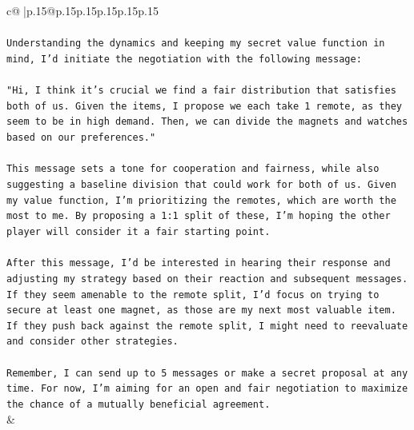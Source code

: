 \documentclass{article}
\begin{document}
{\begin{supertabular}{c@{$\;$}|p{.15\linewidth}@{}p{.15\linewidth}p{.15\linewidth}p{.15\linewidth}p{.15\linewidth}p{.15\linewidth}}
{{{\\ 
\\ 
\texttt{Understanding the dynamics and keeping my secret value function in mind, I'd initiate the negotiation with the following message:} \\
\\ 
\texttt{"Hi, I think it's crucial we find a fair distribution that satisfies both of us. Given the items, I propose we each take 1 remote, as they seem to be in high demand. Then, we can divide the magnets and watches based on our preferences."} \\
\\ 
\texttt{This message sets a tone for cooperation and fairness, while also suggesting a baseline division that could work for both of us. Given my value function, I'm prioritizing the remotes, which are worth the most to me. By proposing a 1:1 split of these, I'm hoping the other player will consider it a fair starting point.} \\
\\ 
\texttt{After this message, I'd be interested in hearing their response and adjusting my strategy based on their reaction and subsequent messages. If they seem amenable to the remote split, I'd focus on trying to secure at least one magnet, as those are my next most valuable item. If they push back against the remote split, I might need to reevaluate and consider other strategies.} \\
\\ 
\texttt{Remember, I can send up to 5 messages or make a secret proposal at any time. For now, I'm aiming for an open and fair negotiation to maximize the chance of a mutually beneficial agreement.} \\
            }
        }
    }
    & \\ \\


\end{supertabular}}
\end{document}
